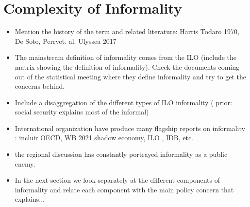 \documentclass[english]{article}
\begin{document}
\section{Complexity of Informality}
\begin{itemize}
    \item Mention the history of the term and related literature: Harris Todaro 1970, De Soto, Perryet. al. Ulyssea 2017
 
    \item The mainstream definition of informality comes from the ILO (include the matrix showing the definition of informality). Check the documents coming out of the statistical meeting where they define informality and try to get the concerns behind. 
    \item Include a disaggregation of the different types of ILO informality ( prior: social security explains most of the informal)
       \item International organization have produce many flagship reports on informality : incluir OECD, WB 2021 shadow economy, ILO , IDB, etc. 
       \item the regional discussion has constantly portrayed informality as a public enemy.  
    \item In the next section we look separately at the different components of informality and relate each component with the main policy concern that explains...
\end{itemize}
\end{document}
